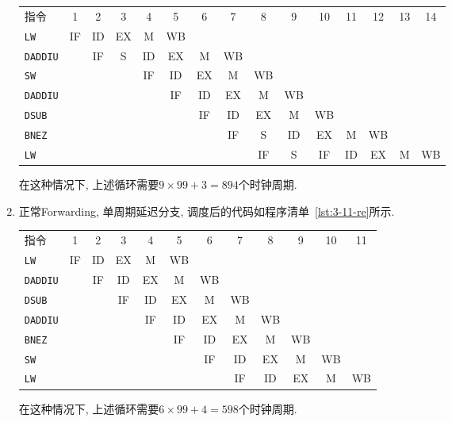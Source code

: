\begin{solve}
\begin{enumerate}
    \begin{flushleft}
      \footnotesize
      \begin{tabular}{@{~}lc@{~}c@{~}c@{~}c@{~}c@{~}c@{~}c@{~}c@{~}c@{~}c@{~}c@{~}c@{~}c@{~}c@{~}}
        指令
                        & 1  & 2  & 3  & 4  & 5  & 6  & 7  & 8  & 9  & 10 & 11 & 12 & 13 & 14 \\
        \texttt{LW}     & IF & ID & EX & M  & WB \\
        \texttt{DADDIU} &    & IF & S  & ID & EX & M  & WB \\
        \texttt{SW}     &    &    &    & IF & ID & EX & M  & WB \\
        \texttt{DADDIU} &    &    &    &    & IF & ID & EX & M  & WB \\
        \texttt{DSUB}   &    &    &    &    &    & IF & ID & EX & M  & WB \\
        \texttt{BNEZ}   &    &    &    &    &    &    & IF & S  & ID & EX & M  & WB \\
        \texttt{LW}     &    &    &    &    &    &    &    & IF & S  & IF & ID & EX & M  & WB \\
      \end{tabular}
    \end{flushleft}

    在这种情况下, 上述循环需要$9\times{}99 + 3 = 894$个时钟周期.
    
  \item 正常Forwarding, 单周期延迟分支, 调度后的代码如程序清单~\ref{lst:3-11-re}所示.

    
      
      \begin{flushleft}
        \footnotesize
        \begin{tabular}{@{~}lc@{~}c@{~}c@{~}c@{~}c@{~}c@{~}c@{~}c@{~}c@{~}c@{~}c@{~}}
          指令
                          & 1  & 2  & 3  & 4  & 5  & 6  & 7  & 8  & 9  & 10 & 11 \\
          \texttt{LW}     & IF & ID & EX & M  & WB \\
          \texttt{DADDIU} &    & IF & ID & EX & M  & WB \\
          \texttt{DSUB}   &    &    & IF & ID & EX & M  & WB \\
          \texttt{DADDIU} &    &    &    & IF & ID & EX & M  & WB \\
          \texttt{BNEZ}   &    &    &    &    & IF & ID & EX & M  & WB \\
          \texttt{SW}     &    &    &    &    &    & IF & ID & EX & M  & WB \\
          \texttt{LW}     &    &    &    &    &    &    & IF & ID & EX & M  & WB \\
        \end{tabular}
      \end{flushleft}

      在这种情况下, 上述循环需要$6\times{}99 + 4 = 598$个时钟周期.
  \end{enumerate}
\end{solve}

